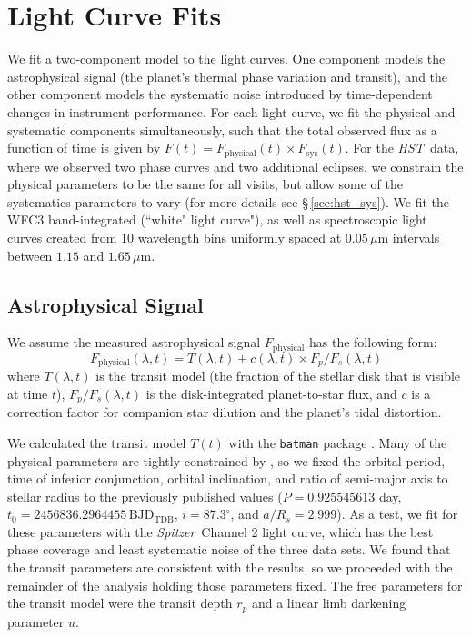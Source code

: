 \documentclass[twocolumn]{aastex61}
\newcommand{\project}[1]{\textsl{#1}}
\newcommand{\HST}{\project{HST}}
\newcommand{\Spitzer}{\project{Spitzer}}
\begin{document}
\section{Light Curve Fits}
\label{sec:fits}
We fit a two-component model to the light curves. One component models the astrophysical signal (the planet's thermal phase variation and transit), and the other component models the systematic noise introduced by time-dependent changes in instrument performance. For each light curve, we fit the physical and systematic components simultaneously, such that the total observed flux as a function of time is given by $F(t) = F_\mathrm{physical}(t) \times F_\mathrm{sys}(t)$. For the \HST\ data, where we observed two phase curves and two additional eclipses, we constrain the physical parameters to be the same for all visits, but allow some of the systematics parameters to vary (for more details see \S\,\ref{sec:hst_sys}). We fit the WFC3 band-integrated (``white" light curve"), as well as spectroscopic light curves created from 10 wavelength bins uniformly spaced at $0.05\,\mu$m intervals between $1.15$ and $1.65\,\mu$m.

\subsection{Astrophysical Signal}
We assume the measured astrophysical signal $F_\mathrm{physical}$ has the following form:
\begin{equation}
	F_\mathrm{physical}(\lambda, t) =  T(\lambda, t) + c(\lambda, t) \times F_p/F_s(\lambda, t)
\end{equation}
where $T(\lambda, t)$ is the transit model (the fraction of the stellar disk that is visible at time $t$), $F_p/F_s(\lambda, t)$ is the disk-integrated planet-to-star flux, and $c$ is a correction factor for companion star dilution and the planet's tidal distortion. 

We calculated the transit model $T(t)$ with the \texttt{batman} package \citep{kreidberg15a}. Many of the physical parameters are tightly constrained by \cite{southworth15}, so we fixed the orbital period, time of inferior conjunction, orbital inclination, and ratio of semi-major axis to stellar radius to the previously published values ($P = 0.925545613$ day, $t_0 = 2456836.2964455\,\mathrm{BJD_{TDB}}$, $i = 87.3^\circ$, and $a/R_s = 2.999$). As a test, we fit for these parameters with the \Spitzer\ Channel 2 light curve, which has the best phase coverage and least systematic noise of the three data sets. We found that the transit parameters are consistent with the \cite{southworth15} results, so we proceeded with the remainder of the analysis holding those parameters fixed.  The free parameters for the transit model were the transit depth $r_p$ and a linear limb darkening parameter $u$. 
\end{document}
